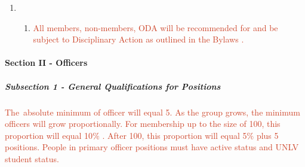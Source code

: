 \documentclass[12pt]{report}
\begin{document}
\begin{enumerate}[label*=\arabic*.]
	\item \begin{enumerate}[label*=\arabic*.]
	\item \textcolor[HTML]{CC4125}{All members, non-members, ODA will be recommended for and be subject to Disciplinary Action as outlined in the Bylaws . }\par


\end{enumerate}
\end{enumerate}\paragraph*{Section II - Officers}
\subparagraph{Subsection 1 - General Qualifications for Positions}
\textcolor[HTML]{CC4125}{\tab The\ absolute minimum of officer will equal 5. As the group grows, the minimum officers will grow proportionally. For membership up to the size of 100, this proportion will equal 10$\%$ . After 100, this proportion will equal 5$\%$  plus 5 positions.  People in primary officer positions must have active status and UNLV student status.}\par
\end{document}
